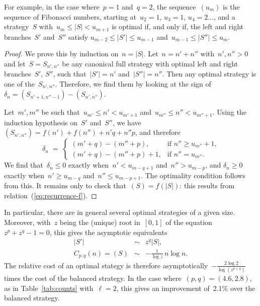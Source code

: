 \documentclass[jmc]{degruyter-journal-a}
\theoremstyle{definition}
\def\abs#1{\left|#1\right|}
\begin{document}
For example, in the case where~$p = 1$ and~$q = 2$, the sequence~$(u_m)$
is the sequence of Fibonacci numbers, starting at~$u_2 = 1$, $u_3 = 1$,
$u_4 = 2$..., and a strategy~$S$ with~$u_{m} \leq \abs{S} < u_{m+1}$ is
optimal if, and only if, the left and right branches~$S'$ and~$S''$
satisfy $u_{m-2} \leq \abs{S'} \leq u_{m-1}$ and~$u_{m-1} \leq \abs{S''} \leq
u_m$.

\begin{proof}
We prove this by induction on~$n = \abs{S}$. Let~$n = n' + n''$ with~$n',
n'' > 0$ and let~$S = S_{n',n''}$ be any canonical full strategy with optimal
left and right branches~$S'$, $S''$, such that~$\abs{S'} = n'$
and~$\abs{S''} = n''$. Then any optimal strategy is one of
the~$S_{n',n''}$. Therefore, we find them by looking at the sign
of~$\delta_n = (S_{n'+1,n''-1}) - (S_{n',n''})$.

Let~$m',m''$ be such that~$u_{m'} \leq n' < u_{m' + 1}$ and~$u_{m''} \leq
n'' < u_{m''+1}$. Using the induction hypothesis on~$S'$ and~$S''$, we
have $(S_{n',n''}) = f(n') + f(n'')  + n' q + n'' p$, and therefore
\begin{equation}
\delta_n \;=\; \begin{cases}
(m' + q) - (m'' + p),& \text{if $n'' \geq u_{m''} + 1$,}\\
(m' + q) - (m'' + p) + 1, &\text{if $n'' = u_{m''}$.}
\end{cases}
\end{equation}
We find that~$\delta_n \leq 0$ exactly when~$n' < u_{m-q+1}$ and~$n'' >
u_{m-p}$, and $\delta_n \geq 0$ exactly when~$n' \geq u_{m-q}$ and~$n''
\leq u_{m-p+1}$. The optimality condition follows from this.
It remains only to check that~$(S) = f(\abs{S})$: this results from
relation~(\ref{eq:recurrence-f}).
\end{proof}

In particular, there are in general several optimal strategies of a given
size. Moreover, with~$z$ being the (unique) root in~$[0,1]$ of the
equation~$z^p + z^q - 1 = 0$, this gives the asymptotic equivalents
\begin{eqnarray}
\abs{S'} &\sim& z^q \abs{S},\\
C_{p,q}(n) = (S) &\sim& -\frac{1}{\log z}\, n \log n.
\end{eqnarray}
The relative cost of an optimal stategy is therefore
asymptotically~$-\frac{2 \log 2}{\log (z^{p+q})}$ times the cost of
the balanced strategy. In the case where~$(p, q) = (4.6, 2.8)$, as in
Table~\ref{tab:counts} with~$\ell = 2$, this gives an improvement
of~2.1\% over the balanced strategy.
\end{document}
